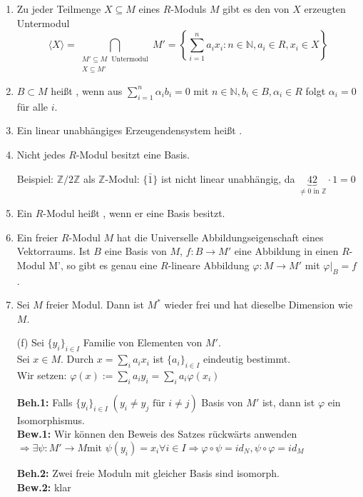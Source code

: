 \begin{Bem}
  \begin{enumerate}
    \item Zu jeder Teilmenge $X \subseteq M$ eines $R$-Moduls $M$ gibt es den von
          $X$ erzeugten Untermodul $$\langle X \rangle = \displaystyle 
          \bigcap_{\substack{M' \subseteq M\; \text{ Untermodul} \\ X \subseteq M'}} M' = \left\{
          \sum_{i=1}^n a_i x_i: n \in \mathbb{N}, a_i \in R, x_i \in X \right\}$$
    \item $B \subset M$ heißt ,
          wenn aus $\displaystyle \sum_{i=1}^n \alpha_i b_i = 0$ mit $n \in
          \mathbb{N}, b_i \in B, \alpha_i \in R$ folgt $\alpha_i = 0$ für alle
          $i$.
    \item Ein linear unabhängiges Erzeugendensystem heißt
          .
    \item Nicht jedes $R$-Modul besitzt eine Basis.

          Beispiel: $\mathbb{Z}/2\mathbb{Z}$ als $\mathbb{Z}$-Modul: $\{\bar{1}\}$
          ist nicht linear unabhängig, da $\underbrace{42}_{\not= 0 \text{ in } \mathbb{Z}} \cdot 1 = 0$
    \item Ein $R$-Modul heißt , wenn er eine
          Basis besitzt.
    \item Ein freier $R$-Modul $M$ hat die Universelle Abbildungseigenschaft eines Vektorraums. Ist $B$ eine
          Basis von $M$, $f: B \to M'$ eine Abbildung in einen $R$-Modul M', so
          gibt es genau eine $R$-lineare Abbildung $\varphi: M \to M'$ mit
          $\varphi|_B = f$.
    \item Sei $M$ freier Modul. Dann ist $M^*$ wieder frei und hat dieselbe
          Dimension wie $M$.
  \end{enumerate}
\end{Bem}

\begin{Bew}
  \begin{enumerate}
    \item[(f)] Sei $\{y_i\}_{i \in I}$ Familie von Elementen von $M'$.\\
			   Sei $x \in M$. Durch $x=\sum_{i}a_ix_i$ ist $\{a_i\}_{i  \in I}$
			   eindeutig bestimmt.\\
			   Wir setzen: $\varphi(x):=\sum_i a_iy_i=\sum_ia_i\varphi(x_i)$

			   \textbf{Beh.1:} Falls $\{y_i\}_{i\in I}\;(y_i \neq y_j \mbox{ für } i\neq
			   j)$ Basis von $M'$ ist, dann ist $\varphi$ ein Isomorphismus.\\
			   \textbf{Bew.1:} Wir können den Beweis des Satzes rückwärts anwenden $\Rightarrow \exists \psi:
			   M' \rightarrow M \text{mit } \psi(y_i)=x_i \forall i \in I \Rightarrow
			   \varphi \circ \psi = id_N, \psi \circ \varphi = id_M$

   			   \textbf{Beh.2:} Zwei freie Moduln mit gleicher Basis sind
  			   isomorph.\\
  			   \textbf{Bew.2:} klar
  \end{enumerate}
\end{Bew}

